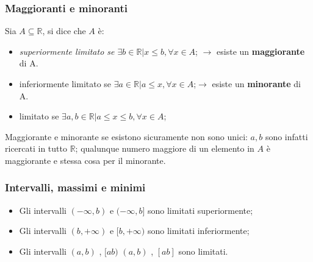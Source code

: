 \documentclass[x11names]{article}
\begin{document}
	\subsubsection{Maggioranti e minoranti}
	\noindent
	Sia $A \subseteq \mathbb{R}$, si dice che $A$ è:
	\begin{itemize}
		\item \textit{superiormente limitato se  $\exists b \in \mathbb{R} | x \leq b, \forall x \in A$}; $\longrightarrow$ esiste un \textbf{maggiorante} di A.
		\item inferiormente limitato se $\exists a \in \mathbb{R} | a \leq x, \forall x \in A$;$\longrightarrow$ esiste un \textbf{minorante} di A.
		\item limitato se $\exists a,b \in \mathbb{R} | a \leq x \leq b, \forall x \in A$;
	\end{itemize}
	
	\noindent
	Maggiorante e minorante se esistono sicuramente non sono unici: $a,b$ sono infatti ricercati in tutto $\mathbb{R}$; qualunque numero maggiore di un elemento in $A$ è maggiorante e stessa cosa per il minorante.
	
	\subsubsection{Intervalli, massimi e minimi}
	\begin{itemize}
		\item Gli intervalli $(-\infty,b) $ e $ (-\infty,b]$ sono limitati superiormente;
		\item Gli intervalli $(b, +\infty) $ e $ [b, +\infty)$ sono limitati inferiormente;
		\item Gli intervalli $(a,b) $ , $ [ab)$ $(a,b) $ , $ [ab]$ sono limitati.
	\end{itemize}
\end{document}
